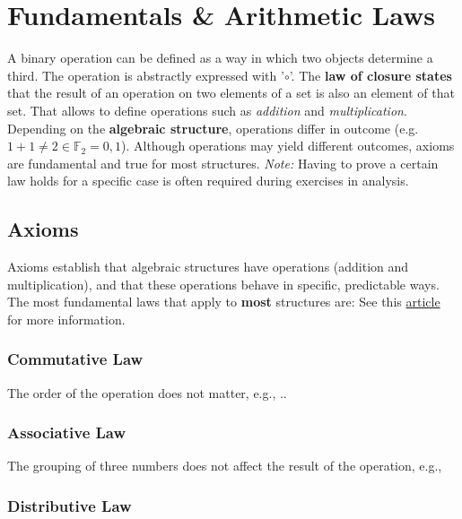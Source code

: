 \chapter{Fundamentals \& Arithmetic Laws}\label{FundamentalArithmeticLaws}

A binary operation can be defined as a way in which two objects determine a third. The operation is abstractly expressed with '$\circ$'. The \textbf{law of closure states} that the result of an operation on two elements of a set is also an element of that set. That allows to define operations such as \textit{addition} and \textit{multiplication}.
Depending on the \textbf{algebraic structure}, operations differ in outcome (e.g. $1 +1 \neq 2 \in \mathbb{F}_{2} = {0,1}$). 
Although operations may yield different outcomes, axioms are fundamental and true for most structures. \textit{Note:} Having to prove a certain law holds for a specific case is often required during exercises in analysis.

\section{Axioms}\label{Axioms}
Axioms establish that algebraic structures have operations (addition and multiplication), and that these operations behave in specific, predictable ways. The most fundamental laws that apply to \textbf{most} structures are:
See this \href{https://math.libretexts.org/Bookshelves/Analysis/Mathematical_Analysis_(Zakon)/02%3A_Real_Numbers_and_Fields/2.01%3A_Axioms_and_Basic_Definitions}{article} for more information.

\subsection{Commutative Law}\label{Commutative Law}

The order of the operation does not matter, e.g., 
..

\subsection{Associative Law}\label{Associative Law}

The grouping of three numbers does not affect the result of the operation, e.g., 

\subsection{Distributive Law}\label{Distributive Law}

